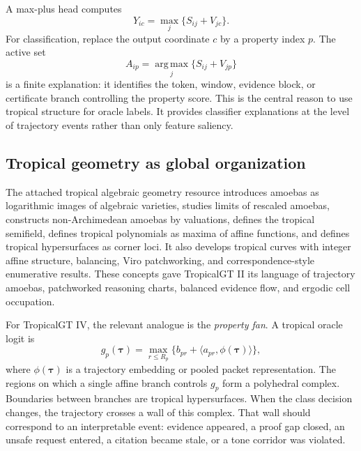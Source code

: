 \documentclass[11pt]{article}
\theoremstyle{definition}
\theoremstyle{remark}
\newcommand{\argmax}{\operatorname*{arg\,max}}
\newcommand{\traj}{\boldsymbol{\tau}}
\numberwithin{equation}{section}
\begin{document}
A max-plus head computes
\begin{equation}
    Y_{ic}=\max_j\{S_{ij}+V_{jc}\}.
\end{equation}
For classification, replace the output coordinate \(c\) by a property index \(p\).  The active set
\begin{equation}
    A_{ip}=\argmax_j\{S_{ij}+V_{jp}\}
\end{equation}
is a finite explanation: it identifies the token, window, evidence block, or certificate branch controlling the property score.  This is the central reason to use tropical structure for oracle labels.  It provides classifier explanations at the level of trajectory events rather than only feature saliency.

\subsection{Tropical geometry as global organization}
The attached tropical algebraic geometry resource introduces amoebas as logarithmic images of algebraic varieties, studies limits of rescaled amoebas, constructs non-Archimedean amoebas by valuations, defines the tropical semifield, defines tropical polynomials as maxima of affine functions, and defines tropical hypersurfaces as corner loci.  It also develops tropical curves with integer affine structure, balancing, Viro patchworking, and correspondence-style enumerative results.  These concepts gave TropicalGT II its language of trajectory amoebas, patchworked reasoning charts, balanced evidence flow, and ergodic cell occupation.

For TropicalGT IV, the relevant analogue is the \emph{property fan}.  A tropical oracle logit is
\begin{equation}
    g_p(\traj)=\max_{r\le R_p}\{b_{pr}+\langle a_{pr},\phi(\traj)\rangle\},
\end{equation}
where \(\phi(\traj)\) is a trajectory embedding or pooled packet representation.  The regions on which a single affine branch controls \(g_p\) form a polyhedral complex.  Boundaries between branches are tropical hypersurfaces.  When the class decision changes, the trajectory crosses a wall of this complex.  That wall should correspond to an interpretable event: evidence appeared, a proof gap closed, an unsafe request entered, a citation became stale, or a tone corridor was violated.
\end{document}
